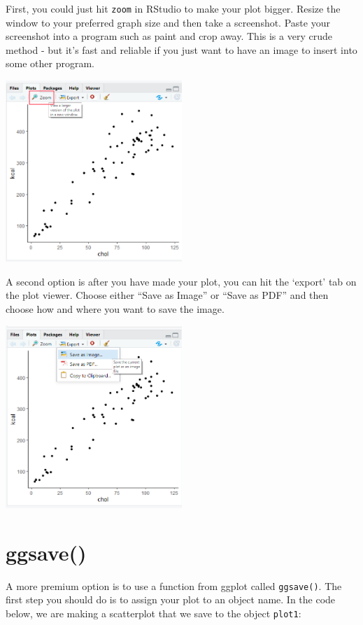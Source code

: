 \documentclass[
  letterpaper,
  DIV=11,
  numbers=noendperiod]{scrreprt}
\begin{document}
First, you could just hit \texttt{zoom} in RStudio to make your plot
bigger. Resize the window to your preferred graph size and then take a
screenshot. Paste your screenshot into a program such as paint and crop
away. This is a very crude method - but it's fast and reliable if you
just want to have an image to insert into some other program.

\includegraphics[width=0.5\textwidth,height=\textheight]{./img/zoom.png}

A second option is after you have made your plot, you can hit the
`export' tab on the plot viewer. Choose either ``Save as Image'' or
``Save as PDF'' and then choose how and where you want to save the
image.

\includegraphics[width=0.5\textwidth,height=\textheight]{./img/zoom2.png}

\hypertarget{ggsave}{%
\section{ggsave()}\label{ggsave}}

A more premium option is to use a function from ggplot called
\texttt{ggsave()}. The first step you should do is to assign your plot
to an object name. In the code below, we are making a scatterplot that
we save to the object \texttt{plot1}:
\end{document}
